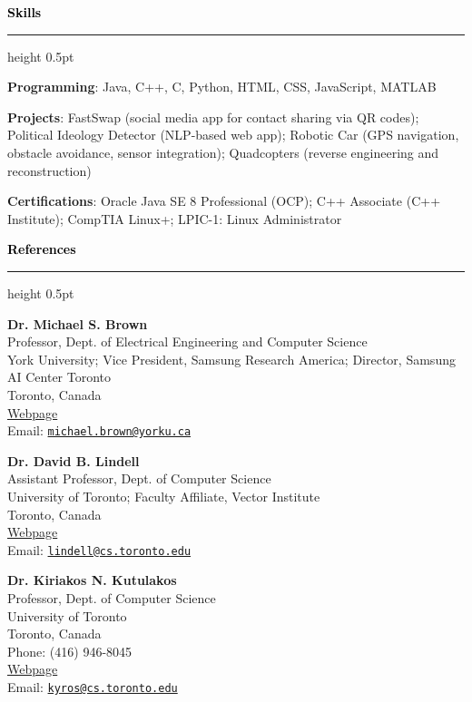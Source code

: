 \documentclass[a4paper, 11pt]{letter}
\newcommand{\sectioncolor}{black}           %
\newcommand{\sectionfontsize}{12pt}         %
\newcommand{\linespacing}{.2em}             %
\newcommand{\section}[1]{%
    \medskip
    {\fontsize{\sectionfontsize}{\sectionfontsize}\textcolor{\sectioncolor}{\bf #1}\strut}\par
    \nointerlineskip
    \hrule height 0.5pt
    \smallskip
}
\newcommand{\cvitem}[2]{
    {\setlength{\parskip}{\linespacing plus0mm minus0mm}\textbf{#1}: #2}

}
\begin{document}
\section{Skills}

\cvitem{Programming}{Java, C++, C, Python, HTML, CSS, JavaScript, MATLAB}
\cvitem{Projects}{FastSwap (social media app for contact sharing via QR codes); Political Ideology Detector (NLP-based web app); Robotic Car (GPS navigation, obstacle avoidance, sensor integration); Quadcopters (reverse engineering and reconstruction)}
\cvitem{Certifications}{Oracle Java SE 8 Professional (OCP); C++ Associate (C++ Institute); CompTIA Linux+; LPIC-1: Linux Administrator}

\section{References}

\textbf{Dr. Michael S. Brown}\\
Professor, Dept. of Electrical Engineering and Computer Science\\
York University; Vice President, Samsung Research America; Director, Samsung AI Center Toronto\\
Toronto, Canada\\
\href{https://research.samsung.com/aicenter_toronto}{Webpage}\\
Email: \href{mailto:michael.brown@yorku.ca}{\texttt{michael.brown@yorku.ca}}

\vspace{1em}

\textbf{{Dr}. David B. Lindell}\\
Assistant Professor, Dept. of Computer Science\\
University of Toronto; Faculty Affiliate, Vector Institute\\
Toronto, Canada\\
\href{https://davidlindell.com}{Webpage}\\
Email: \href{mailto:lindell@cs.toronto.edu}{\texttt{lindell@cs.toronto.edu}}

\vspace{1em}

\textbf{Dr. Kiriakos N. Kutulakos}\\
Professor, Dept. of Computer Science\\
University of Toronto\\
Toronto, Canada\\
Phone: (416) 946-8045\\
\href{https://www.cs.toronto.edu/~kyros/}{Webpage}\\
Email: \href{mailto:kyros@cs.toronto.edu}{\texttt{kyros@cs.toronto.edu}}
\end{document}
